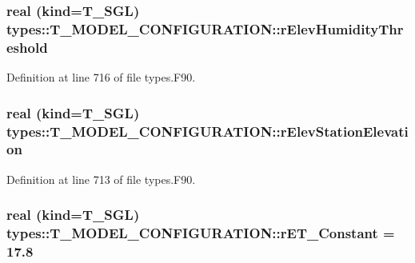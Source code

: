 \hypertarget{typetypes_1_1_t___m_o_d_e_l___c_o_n_f_i_g_u_r_a_t_i_o_n_a006aa06621dec94e7614c63f5c852815}{
\subsubsection[{rElevHumidityThreshold}]{\setlength{\rightskip}{0pt plus 5cm}real (kind={\bf T\_\-SGL}) {\bf types::T\_\-MODEL\_\-CONFIGURATION::rElevHumidityThreshold}}}
\label{typetypes_1_1_t___m_o_d_e_l___c_o_n_f_i_g_u_r_a_t_i_o_n_a006aa06621dec94e7614c63f5c852815}


Definition at line 716 of file types.F90.

\hypertarget{typetypes_1_1_t___m_o_d_e_l___c_o_n_f_i_g_u_r_a_t_i_o_n_ac312f92f94aef8a023f2d9c1ddd79392}{
\subsubsection[{rElevStationElevation}]{\setlength{\rightskip}{0pt plus 5cm}real (kind={\bf T\_\-SGL}) {\bf types::T\_\-MODEL\_\-CONFIGURATION::rElevStationElevation}}}
\label{typetypes_1_1_t___m_o_d_e_l___c_o_n_f_i_g_u_r_a_t_i_o_n_ac312f92f94aef8a023f2d9c1ddd79392}


Definition at line 713 of file types.F90.

\hypertarget{typetypes_1_1_t___m_o_d_e_l___c_o_n_f_i_g_u_r_a_t_i_o_n_aee473a29bafdebd987715c5f77da0d69}{
\subsubsection[{rET\_\-Constant}]{\setlength{\rightskip}{0pt plus 5cm}real (kind={\bf T\_\-SGL}) {\bf types::T\_\-MODEL\_\-CONFIGURATION::rET\_\-Constant} = 17.8}}
\label{typetypes_1_1_t___m_o_d_e_l___c_o_n_f_i_g_u_r_a_t_i_o_n_aee473a29bafdebd987715c5f77da0d69}


